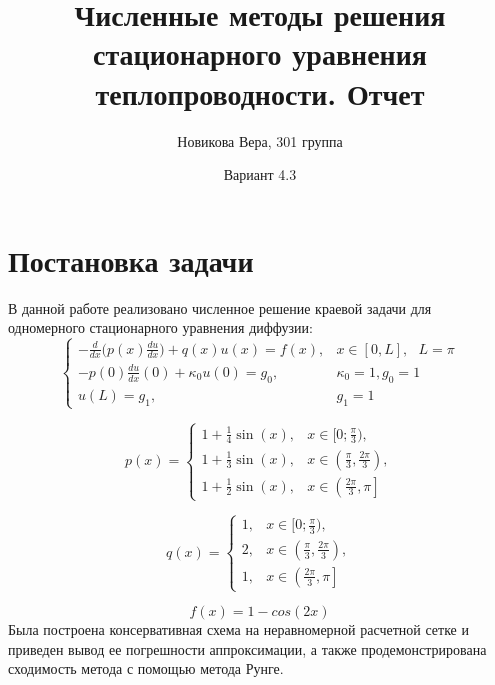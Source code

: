 \documentclass[12pt]{article}
\title{Численные методы решения стационарного уравнения теплопроводности. Отчет}
\author{Новикова Вера, 301 группа}
\date{Вариант 4.3}
\begin{document}
\maketitle

\section*{Постановка задачи}
В данной работе реализовано численное решение краевой задачи для одномерного стационарного уравнения диффузии:
\[
\begin{cases}
    -\frac{d}{dx} \bigg(p(x) \frac{du}{dx}\bigg) +q(x)u(x)= f(x), & x \in [0, L], \text{ } L = \pi\\
    -p(0)\frac{du}{dx}(0) + \kappa_0 u(0) = g_0, & \kappa_0 = 1, g_0 = 1 \\ 
    u(L) = g_1, & g_1 = 1 
\end{cases}
\]

\begin{center}
\begin{minipage}{0.45\textwidth}
\begin{equation*}
p(x) =
\begin{cases} 
1 + \frac{1}{4}\sin(x), & x \in [0; \frac{\pi}{3}), \\
1 + \frac{1}{3}\sin(x), & x \in \left(\frac{\pi}{3}, \frac{2\pi}{3}\right), \\
1 + \frac{1}{2}\sin(x), & x \in \left(\frac{2\pi}{3}, \pi\right]
\end{cases}
\end{equation*}
\end{minipage}
\hfill
\begin{minipage}{0.45\textwidth}
\begin{equation*}
q(x) =
\begin{cases} 
1, & x \in [0; \frac{\pi}{3}), \\
2, & x \in \left(\frac{\pi}{3}, \frac{2\pi}{3}\right), \\
1, & x \in \left(\frac{2\pi}{3}, \pi\right]
\end{cases}
\end{equation*}
\end{minipage}
\end{center}
\[
f(x) = 1-cos(2x)
\]
Была построена консервативная схема на неравномерной расчетной сетке и приведен вывод ее погрешности аппроксимации, а также продемонстрирована сходимость метода с помощью метода Рунге.
\end{document}
